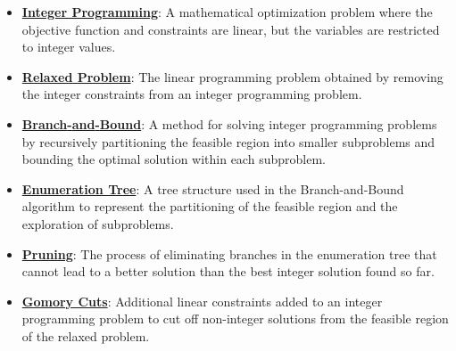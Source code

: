 \documentclass{article}%
\begin{document}
\begin{itemize}[leftmargin=*]%
\item \href{https://www.math.purdue.edu/~yipn/421//2024-10-31-IntLinProg.pdf#page=1}{\textbf{Integer Programming}}: A mathematical optimization problem where the objective function and constraints are linear, but the variables are restricted to integer values.%
\item \href{https://www.math.purdue.edu/~yipn/421//2024-10-31-IntLinProg.pdf#page=2}{\textbf{Relaxed Problem}}: The linear programming problem obtained by removing the integer constraints from an integer programming problem.%
\item \href{https://www.math.purdue.edu/~yipn/421//2024-10-31-IntLinProg.pdf#page=5}{\textbf{Branch{-}and{-}Bound}}: A method for solving integer programming problems by recursively partitioning the feasible region into smaller subproblems and bounding the optimal solution within each subproblem.%
\item \href{https://www.math.purdue.edu/~yipn/421//2024-10-31-IntLinProg.pdf#page=6}{\textbf{Enumeration Tree}}: A tree structure used in the Branch-and-Bound algorithm to represent the partitioning of the feasible region and the exploration of subproblems.%
\item \href{https://www.math.purdue.edu/~yipn/421//2024-10-31-IntLinProg.pdf#page=11}{\textbf{Pruning}}: The process of eliminating branches in the enumeration tree that cannot lead to a better solution than the best integer solution found so far.%
\item \href{https://www.math.purdue.edu/~yipn/421//2024-10-31-IntLinProg.pdf#page=15}{\textbf{Gomory Cuts}}: Additional linear constraints added to an integer programming problem to cut off non-integer solutions from the feasible region of the relaxed problem.%
\end{itemize}%
\end{document}
